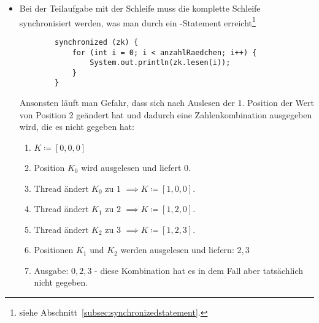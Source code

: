 \begin{itemize}
    \item Bei der Teilaufgabe mit der Schleife muss die komplette Schleife synchronisiert werden, was man durch ein -Statement erreicht\footnote{siehe Abschnitt~\ref{subsec:synchronizedstatement}.}
    \begin{verbatim}
        synchronized (zk) {
            for (int i = 0; i < anzahlRaedchen; i++) {
                System.out.println(zk.lesen(i));
            }
        }
    \end{verbatim}
    Ansonsten läuft man Gefahr, dass sich nach Auslesen der 1. Position der Wert von Position 2 geändert hat und dadurch eine
    Zahlenkombination ausgegeben wird, die es nicht gegeben hat:
    \begin{enumerate}
        \item $K\coloneqq[0, 0, 0]$
        \item Position $K_0$ wird ausgelesen und liefert $0$.
        \item Thread ändert $K_0$ zu $1$ $\implies K\coloneqq[1, 0, 0] $.
        \item Thread ändert $K_1$ zu $2$ $\implies K\coloneqq[1, 2, 0] $.
        \item Thread ändert $K_2$ zu $3$ $\implies K\coloneqq[1, 2, 3] $.
        \item Positionen $K_1$ und $K_2$ werden ausgelesen und liefern: $2, 3$
        \item Ausgabe: $0, 2, 3$ - diese Kombination hat es in dem Fall aber tatsächlich nicht gegeben.
    \end{enumerate}
\end{itemize}

